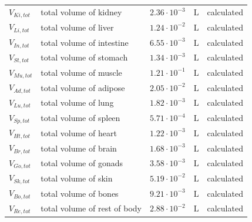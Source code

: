 \documentclass[preprint,12pt,authoryear]{elsarticle}
\begin{document}
\begin{longtable}{P{2cm}P{3.5cm}P{2cm}P{1cm}P{2.5cm}}
$V_{Ki,tot}$ & total volume of kidney & $2.36 \cdot 10^{-3}$ & $\text{L}$ & calculated \\
$V_{Li,tot}$ & total volume of liver & $1.24 \cdot 10^{-2}$ & $\text{L}$ & calculated \\
$V_{In,tot}$ & total volume of intestine & $6.55 \cdot 10^{-3}$ & $\text{L}$ & calculated \\
$V_{St,tot}$ & total volume of stomach & $1.34 \cdot 10^{-3}$ & $\text{L}$ & calculated \\
$V_{Mu,tot}$ & total volume of muscle & $1.21 \cdot 10^{-1}$ & $\text{L}$ & calculated \\
$V_{Ad,tot}$ & total volume of adipose & $2.05 \cdot 10^{-2}$ & $\text{L}$ & calculated \\
$V_{Lu,tot}$ & total volume of lung & $1.82 \cdot 10^{-3}$ & $\text{L}$ & calculated \\
$V_{Sp,tot}$ & total volume of spleen & $5.71 \cdot 10^{-4}$ & $\text{L}$ & calculated \\
$V_{Ht,tot}$ & total volume of heart & $1.22 \cdot 10^{-3}$ & $\text{L}$ & calculated \\
$V_{Br,tot}$ & total volume of brain & $1.68 \cdot 10^{-3}$ & $\text{L}$ & calculated \\
$V_{Go,tot}$ & total volume of gonads & $3.58 \cdot 10^{-3}$ & $\text{L}$ & calculated \\
$V_{Sk,tot}$ & total volume of skin & $5.19 \cdot 10^{-2}$ & $\text{L}$ & calculated \\
$V_{Bo,tot}$ & total volume of bones & $9.21 \cdot 10^{-3}$ & $\text{L}$ & calculated \\
$V_{Re,tot}$ & total volume of rest of body & $2.88 \cdot 10^{-2}$ & $\text{L}$ & calculated \\
\midrule\midrule


\end{longtable}
\end{document}
